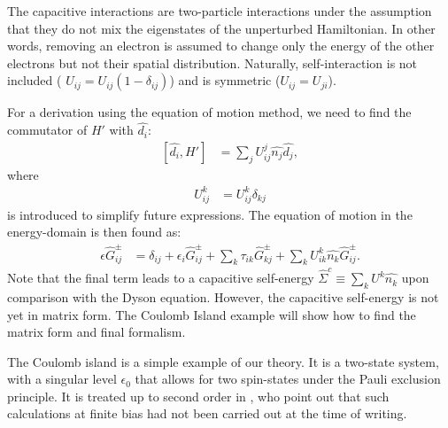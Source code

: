 \documentclass{article}
\begin{document}
\begin{multicols}{2}
        The capacitive interactions are two-particle interactions under the assumption that they do not mix the eigenstates of the unperturbed Hamiltonian. In other words, removing an electron is assumed to change only the energy of the other electrons but not their spatial distribution. Naturally, self-interaction is not included ( $U_{ij} = U_{ij} (1-\delta_{ij})$) and is symmetric ($U_{ij} = U_{ji}$).
        
        For a derivation using the equation of motion method, we need to find the commutator of $H'$ with $\hat{d_i}$:
        \begin{align}
            \left[\hat{d_i}, H'\right] &= \sum_j U^j_{ij} \hat{n_j}\hat{d_j}, \label{eq:commutator}
        \end{align}
        where
        \begin{align*}
        U^k_{ij} &= U_{ij}^k \delta_{kj}
        \end{align*}
        is introduced to simplify future expressions. The equation of motion in the energy-domain is then found as:
        \begin{align*}
        \epsilon \hat{G}_{ij}^\pm &= \delta_{ij} + \epsilon_i \hat{G}_{ij}^\pm + \sum_k \tau_{ik} \hat{G}_{kj}^\pm + \sum_k U^k_{ik} \hat{n_k} \hat{G}_{ij}^\pm.
        \end{align*}
        Note that the final term leads to a capacitive self-energy $\hat{\Sigma}^c \equiv \sum_k U^k \hat{n_k}$ upon comparison with the Dyson equation. However, the capacitive self-energy is not yet in matrix form. The Coulomb Island example will show how to find the matrix form and final formalism.
        
        The Coulomb island is a simple example of our theory. It is a two-state system, with a singular level $\epsilon_0$ that allows for two spin-states under the Pauli exclusion principle. It is treated up to second order in \citet{haugjauho}, who point out that such calculations at finite bias had not been carried out at the time of writing. 
        

\end{multicols}
\end{document}
